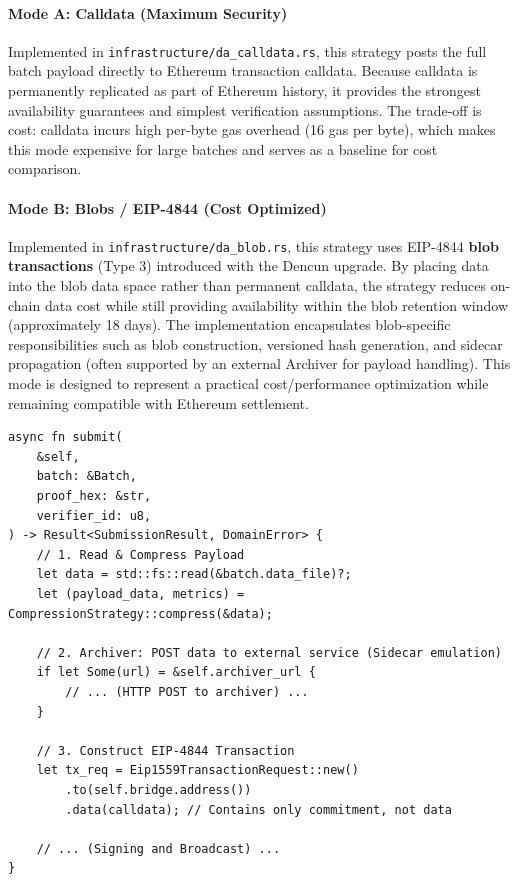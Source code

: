 \paragraph{Mode A: Calldata (Maximum Security)}
Implemented in \texttt{infrastructure/da\_calldata.rs}, this strategy posts the full batch payload directly to Ethereum transaction calldata. Because calldata is permanently replicated as part of Ethereum history, it provides the strongest availability guarantees and simplest verification assumptions. The trade-off is cost: calldata incurs high per-byte gas overhead (16 gas per byte), which makes this mode expensive for large batches and serves as a baseline for cost comparison.

\paragraph{Mode B: Blobs / EIP-4844 (Cost Optimized)}
Implemented in \texttt{infrastructure/da\_blob.rs}, this strategy uses EIP-4844 \textbf{blob transactions} (Type 3) introduced with the Dencun upgrade. By placing data into the blob data space rather than permanent calldata, the strategy reduces on-chain data cost while still providing availability within the blob retention window (approximately 18 days). The implementation encapsulates blob-specific responsibilities such as blob construction, versioned hash generation, and sidecar propagation (often supported by an external Archiver for payload handling). This mode is designed to represent a practical cost/performance optimization while remaining compatible with Ethereum settlement.

\begin{lstlisting}[style=rustStyle, caption={Blob strategy submission logic}, label={lst:blob-submit}]
async fn submit(
    &self,
    batch: &Batch,
    proof_hex: &str,
    verifier_id: u8,
) -> Result<SubmissionResult, DomainError> {
    // 1. Read & Compress Payload
    let data = std::fs::read(&batch.data_file)?;
    let (payload_data, metrics) = CompressionStrategy::compress(&data);

    // 2. Archiver: POST data to external service (Sidecar emulation)
    if let Some(url) = &self.archiver_url {
        // ... (HTTP POST to archiver) ...
    }

    // 3. Construct EIP-4844 Transaction
    let tx_req = Eip1559TransactionRequest::new()
        .to(self.bridge.address())
        .data(calldata); // Contains only commitment, not data

    // ... (Signing and Broadcast) ...
}
\end{lstlisting}

